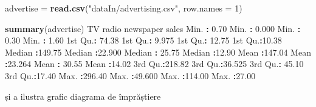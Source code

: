 \documentclass[]{article}
\newenvironment{Shaded}{\begin{snugshade}}{\end{snugshade}}
\newcommand{\KeywordTok}[1]{\textcolor[rgb]{0.13,0.29,0.53}{\textbf{#1}}}
\newcommand{\DataTypeTok}[1]{\textcolor[rgb]{0.13,0.29,0.53}{#1}}
\newcommand{\DecValTok}[1]{\textcolor[rgb]{0.00,0.00,0.81}{#1}}
\newcommand{\FloatTok}[1]{\textcolor[rgb]{0.00,0.00,0.81}{#1}}
\newcommand{\StringTok}[1]{\textcolor[rgb]{0.31,0.60,0.02}{#1}}
\newcommand{\OperatorTok}[1]{\textcolor[rgb]{0.81,0.36,0.00}{\textbf{#1}}}
\newcommand{\NormalTok}[1]{#1}
\begin{document}
\begin{Shaded}
\begin{Highlighting}[]
\NormalTok{advertise =}\StringTok{ }\KeywordTok{read.csv}\NormalTok{(}\StringTok{"dataIn/advertising.csv"}\NormalTok{, }\DataTypeTok{row.names =} \DecValTok{1}\NormalTok{)}

\KeywordTok{summary}\NormalTok{(advertise)}
\NormalTok{       TV             radio          newspaper          sales      }
\NormalTok{ Min.   }\OperatorTok{:}\StringTok{  }\FloatTok{0.70}\NormalTok{   Min.   }\OperatorTok{:}\StringTok{ }\FloatTok{0.000}\NormalTok{   Min.   }\OperatorTok{:}\StringTok{  }\FloatTok{0.30}\NormalTok{   Min.   }\OperatorTok{:}\StringTok{ }\FloatTok{1.60}  
\NormalTok{ 1st Qu.}\OperatorTok{:}\StringTok{ }\FloatTok{74.38}\NormalTok{   1st Qu.}\OperatorTok{:}\StringTok{ }\FloatTok{9.975}\NormalTok{   1st Qu.}\OperatorTok{:}\StringTok{ }\FloatTok{12.75}\NormalTok{   1st Qu.}\OperatorTok{:}\FloatTok{10.38}  
\NormalTok{ Median }\OperatorTok{:}\FloatTok{149.75}\NormalTok{   Median }\OperatorTok{:}\FloatTok{22.900}\NormalTok{   Median }\OperatorTok{:}\StringTok{ }\FloatTok{25.75}\NormalTok{   Median }\OperatorTok{:}\FloatTok{12.90}  
\NormalTok{ Mean   }\OperatorTok{:}\FloatTok{147.04}\NormalTok{   Mean   }\OperatorTok{:}\FloatTok{23.264}\NormalTok{   Mean   }\OperatorTok{:}\StringTok{ }\FloatTok{30.55}\NormalTok{   Mean   }\OperatorTok{:}\FloatTok{14.02}  
\NormalTok{ 3rd Qu.}\OperatorTok{:}\FloatTok{218.82}\NormalTok{   3rd Qu.}\OperatorTok{:}\FloatTok{36.525}\NormalTok{   3rd Qu.}\OperatorTok{:}\StringTok{ }\FloatTok{45.10}\NormalTok{   3rd Qu.}\OperatorTok{:}\FloatTok{17.40}  
\NormalTok{ Max.   }\OperatorTok{:}\FloatTok{296.40}\NormalTok{   Max.   }\OperatorTok{:}\FloatTok{49.600}\NormalTok{   Max.   }\OperatorTok{:}\FloatTok{114.00}\NormalTok{   Max.   }\OperatorTok{:}\FloatTok{27.00}  
\end{Highlighting}
\end{Shaded}

și a ilustra grafic diagrama de împrăștiere

\begin{Shaded}
\end{Shaded}
\end{document}
